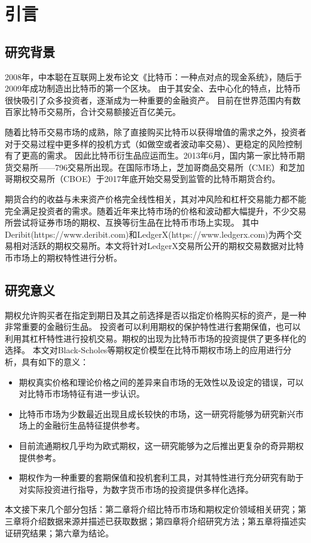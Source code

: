 \chapter{引言}
\section{研究背景}
\par{2008年，中本聪在互联网上发布论文《比特币：一种点对点的现金系统》\cite{Nakamoto_bitcoin:a}，随后于2009年成功制造出比特币的第一个区块。
由于其安全、去中心化的特点，比特币很快吸引了众多投资者，逐渐成为一种重要的金融资产。
目前在世界范围内有数百家比特币交易所，合计交易额接近百亿美元。
}
\par{随着比特币交易市场的成熟，除了直接购买比特币以获得增值的需求之外，投资者对于交易过程中更多样的投机方式（如做空或者波动率交易）、更稳定的风险控制有了更高的需求。
因此比特币衍生品应运而生。2013年6月，国内第一家比特币期货交易所——796交易所出现。在国际市场上，芝加哥商品交易所（CME）和芝加哥期权交易所（CBOE）于2017年底开始交易受到监管的比特币期货合约。
}
\par{期货合约的收益与未来资产价格完全线性相关，其对冲风险和杠杆交易能力都不能完全满足投资者的需求。随着近年来比特市场的价格和波动都大幅提升，不少交易所尝试将证券市场的期权、互换等衍生品在比特币市场上实现。
其中Deribit(https://www.deribit.com)和LedgerX(https://www.ledgerx.com)为两个交易相对活跃的期权交易所。本文将针对LedgerX交易所公开的期权交易数据对比特币市场上的期权特性进行分析。}
\section{研究意义}
期权允许购买者在指定到期日及其之前选择是否以指定价格购买标的资产，是一种非常重要的金融衍生品。
投资者可以利用期权的保护特性进行套期保值，也可以利用其杠杆特性进行投机交易。期权的出现为比特币市场的投资提供了更多样化的选择。
本文对Black-Scholes等期权定价模型在比特币期权市场上的应用进行分析，具有如下的意义：
\begin{itemize}
    \item 期权真实价格和理论价格之间的差异来自市场的无效性以及设定的错误，可以对比特币市场特征有进一步认识。
    \item  比特币市场为少数最近出现且成长较快的市场，这一研究将能够为研究新兴市场上的金融衍生品特征提供参考。
    \item 目前流通期权几乎均为欧式期权，这一研究能够为之后推出更复杂的奇异期权提供参考。
    \item 期权作为一种重要的套期保值和投机套利工具，对其特性进行充分研究有助于对实际投资进行指导，为数字货币市场的投资提供多样化选择。
  \end{itemize}
本文接下来几个部分包括：第二章将介绍比特币市场和期权定价领域相关研究；第三章将介绍数据来源并描述已获取数据；第四章将介绍研究方法；第五章将描述实证研究结果；第六章为结论。